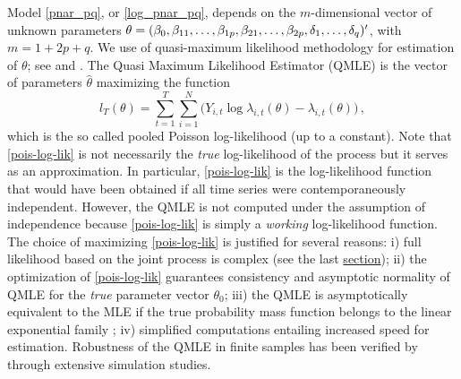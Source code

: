 Model \eqref{pnar_pq}, or \eqref{log_pnar_pq}, depends on the  $m$-dimensional vector of unknown parameters $\theta=(\beta_0, \beta_{11},\dots, \beta_{1p},\break \beta_{21}, \penalty 0 \dots, \beta_{2p}, \delta_1,\dots,\delta_q)^\prime$, with $ m=1+2p+q$. We use  of quasi-maximum likelihood methodology
for estimation of $\theta$;  see \cite{wedderburn1974quasi} and \cite{gourieroux1984pseudo}. The Quasi Maximum Likelihood Estimator (QMLE) is the vector of parameters $\hat{\theta}$ maximizing the function
\begin{equation}
	l_{T}(\theta)=\sum_{t=1}^{T}\sum_{i=1}^{N}\Big(  Y_{i,t}\log\lambda_{i,t}(\theta)-\lambda_{i,t}(\theta)\Big) \,,
	\label{pois-log-lik}
\end{equation}
which is the so called pooled Poisson log-likelihood (up to a constant). Note that \eqref{pois-log-lik}
is not necessarily the \emph{true} log-likelihood of the process but it serves as an approximation. In particular, 
\eqref{pois-log-lik} is the log-likelihood function that would have been obtained if all time series were contemporaneously independent.  However, the QMLE is not computed under the assumption of independence because  \eqref{pois-log-lik} is  simply a  \emph{working} log-likelihood function.  
The choice of maximizing \eqref{pois-log-lik} is justified for several reasons: 
i) full likelihood based on the joint process %
 is complex (see the last \hyperref[sec: Generate data]{section});  
ii) the optimization of \eqref{pois-log-lik} guarantees consistency and asymptotic normality of QMLE  for the \emph{true} parameter vector  $\theta_0$; iii)  the QMLE is asymptotically equivalent to the MLE if the true probability mass function belongs to the linear exponential family \citep{gourieroux1984pseudo}; 
iv) simplified computations entailing increased speed for estimation.
Robustness of the QMLE in finite samples has been verified by \cite{armillotta_fokianos_2021} through extensive simulation studies. 

